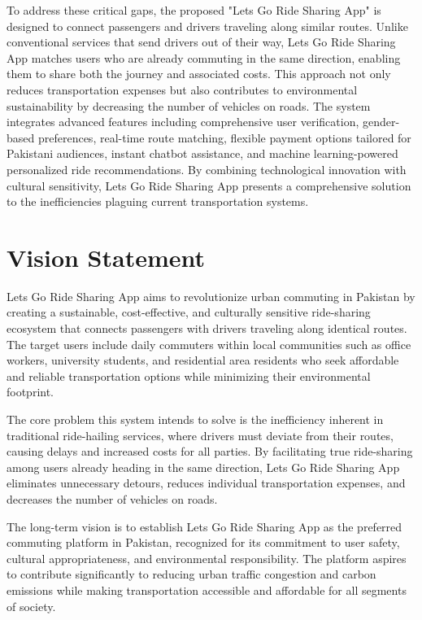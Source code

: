 To address these critical gaps, the proposed "Lets Go Ride Sharing App" is designed to connect passengers and drivers traveling along similar routes. Unlike conventional services that send drivers out of their way, Lets Go Ride Sharing App matches users who are already commuting in the same direction, enabling them to share both the journey and associated costs. This approach not only reduces transportation expenses but also contributes to environmental sustainability by decreasing the number of vehicles on roads. The system integrates advanced features including comprehensive user verification, gender-based preferences, real-time route matching, flexible payment options tailored for Pakistani audiences, instant chatbot assistance, and machine learning-powered personalized ride recommendations. By combining technological innovation with cultural sensitivity, Lets Go Ride Sharing App presents a comprehensive solution to the inefficiencies plaguing current transportation systems.


\section{Vision Statement}

Lets Go Ride Sharing App aims to revolutionize urban commuting in Pakistan by creating a sustainable, cost-effective, and culturally sensitive ride-sharing ecosystem that connects passengers with drivers traveling along identical routes. The target users include daily commuters within local communities such as office workers, university students, and residential area residents who seek affordable and reliable transportation options while minimizing their environmental footprint.

The core problem this system intends to solve is the inefficiency inherent in traditional ride-hailing services, where drivers must deviate from their routes, causing delays and increased costs for all parties. By facilitating true ride-sharing among users already heading in the same direction, Lets Go Ride Sharing App eliminates unnecessary detours, reduces individual transportation expenses, and decreases the number of vehicles on roads.

The long-term vision is to establish Lets Go Ride Sharing App as the preferred commuting platform in Pakistan, recognized for its commitment to user safety, cultural appropriateness, and environmental responsibility. The platform aspires to contribute significantly to reducing urban traffic congestion and carbon emissions while making transportation accessible and affordable for all segments of society.

